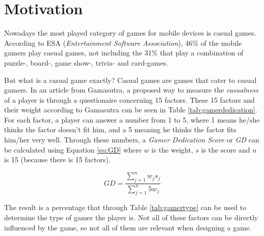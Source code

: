 \section{Motivation} \label{sec:motivation}
Nowadays the most played category of games for mobile devices is casual games.
According to ESA\cite{ESA}\cite{ESApdf} (\textit{Entertainment Software Association}), 46\% of the mobile gamers play casual games, not including the 31\% that play a combination of puzzle-, board-, game show-, trivia- and card-games.

But what is a casual game exactly?
Casual games are games that cater to casual gamers.
In an article from Gamasutra, a proposed way to measure the \textit{casualness} of a player is through a questionaire concerning 15 factors\cite{casual_vs_hardcore}.
These 15 factors and their weight according to Gamasutra can be seen in Table \ref{tab:gamerdedication}\cite{casual_vs_hardcore}.
For each factor, a player can answer a number from 1 to 5, where 1 means he/she thinks the factor doesn't fit him, and a 5 meaning he thinks the factor fits him/her very well.
Through these numbers, a \emph{Gamer Dedication Score} or \emph{GD} can be calculated using Equation \ref{eq:GD} where $w$ is the weight, $s$ is the score and $n$ is 15 (because there is 15 factors).

\begin{equation}\label{eq:GD}
GD = \frac{\sum\limits_{j=1}^n w_j s_j}{\sum\limits_{j=1}^n 5 w_j}
\end{equation}

The result is a percentage that through Table \ref{tab:gamertype} can be used to determine the type of gamer the player is\cite{casual_vs_hardcore}.
Not all of these factors can be directly influenced by the game, so not all of them are relevant when designing a game.

